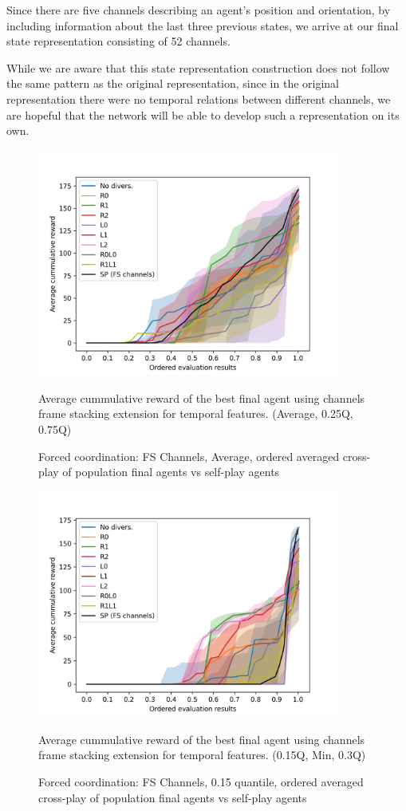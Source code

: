 Since there are five channels describing an agent's position and orientation, by including information about the last three previous states, we arrive at our final state representation consisting of 52 channels.

While we are aware that this state representation construction does not follow the same pattern as the original representation, since in the original representation there were no temporal relations between different channels, we are hopeful that the network will be able to develop such a representation on its own.

\begin{figure}[!ht]
    \centering
    \includegraphics*[width=10cm]{../img/FSChannelsOrderedAvg.png}

    \caption{Forced coordination: FS Channels, Average, ordered averaged cross-play of population final agents vs self-play agents}
    \label{FSChannelsOrderedAvg}
    \medskip
    \small 
    Average cummulative reward of the best final agent using channels frame stacking extension for temporal features.    
    (Average, 0.25Q, 0.75Q)

\end{figure}

\begin{figure}[!ht]
    \centering
    \includegraphics*[width=10cm]{../img/FSChannelsOrderedQ15.png}
    
    \caption{Forced coordination: FS Channels, 0.15 quantile, ordered averaged cross-play of population final agents vs self-play agents}
    \label{FSChannelsOrderedQ15}
    \medskip
    \small 
    Average cummulative reward of the best final agent using channels frame stacking extension for temporal features. 
    (0.15Q, Min, 0.3Q)

\end{figure}


